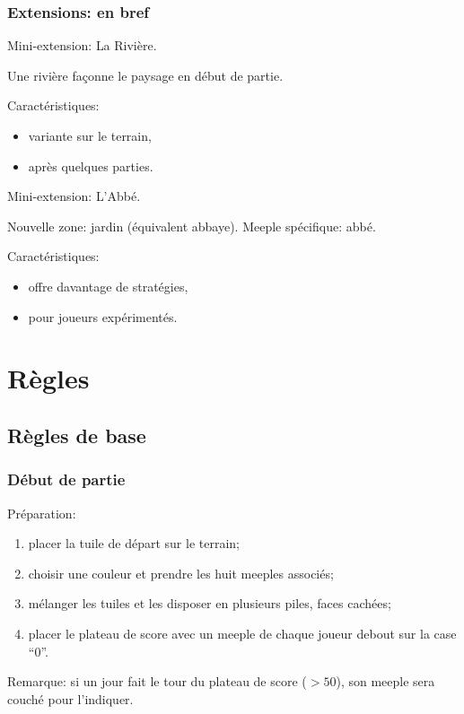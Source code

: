 \documentclass[11pt]{beamer}
\begin{document}
\begin{frame}
	\frametitle{Extensions: en bref}
	
	Mini-extension: \alert{La Rivière}.
	
	Une rivière façonne le paysage en début de partie.
	
	Caractéristiques:
	\begin{itemize}
		\item variante sur le terrain,
		\item après quelques parties.
	\end{itemize}


	\vspace*{1ex}
	
	
	Mini-extension: \alert{L'Abbé}.
	
	Nouvelle zone: jardin (équivalent abbaye).
	Meeple spécifique: abbé.
	
	Caractéristiques:
	\begin{itemize}
		\item offre davantage de stratégies,
		\item pour joueurs expérimentés.
	\end{itemize}
\end{frame}


\section{Règles}

	\subsection{Règles de base}

\begin{frame}
	\frametitle{Début de partie}
	
	Préparation:
	\begin{enumerate}
		\item placer la tuile de départ sur le terrain;
		\item choisir une couleur et prendre les huit meeples associés;
		\item mélanger les tuiles et les disposer en plusieurs piles, faces cachées;
		\item placer le plateau de score avec un meeple de chaque joueur debout sur la case \enquote{0}.
	\end{enumerate}

	Remarque: si un jour fait le tour du plateau de score ($>50$), son meeple sera couché pour l'indiquer.
\end{frame}
\end{document}
